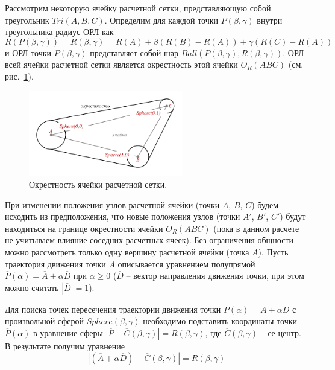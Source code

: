 Рассмотрим некоторую ячейку расчетной сетки, представляющую собой треугольник $Tri(A, B, C)$.
Определим для каждой точки $P(\beta,\gamma)$ внутри треугольника радиус ОРЛ как
\begin{equation}
	R(P(\beta,\gamma)) = R(\beta,\gamma) = R(A) + \beta(R(B) - R(A)) + \gamma(R(C) - R(A))
\end{equation}
и ОРЛ точки $P(\beta,\gamma)$ представляет собой шар $Ball(P(\beta,\gamma), R(\beta,\gamma))$.
ОРЛ всей ячейки расчетной сетки является окрестность этой ячейки $O_R(ABC)$ (см. рис.~\ref{fig:text_1_remesh_common_envelope_1}).

\begin{figure}[ht]
\centering
\includegraphics[width=0.6\textwidth]{fig/3dr_triangle.pdf}
\singlespacing
{}\caption{Окрестность ячейки расчетной сетки.}
\label{fig:text_1_remesh_common_envelope_1}
\end{figure}

При изменении положения узлов расчетной ячейки (точки $A$, $B$, $C$) будем исходить из предположения, что новые положения узлов (точки $A'$, $B'$, $C'$) будут находиться на границе окрестности ячейки $O_R(ABC)$ (пока в данном расчете не учитываем влияние соседних расчетных ячеек).
Без ограничения общности можно рассмотреть только одну вершину расчетной ячейки (точка $A$).
Пусть траектория движения точки $A$ описывается уравнением полупрямой $\overline{P}(\alpha) = \overline{A} + \alpha \overline{D}$ при $\alpha \ge 0$ ($\overline{D}$ -- вектор направления движения точки, при этом можно считать $|\overline{D}| = 1$).

Для поиска точек пересечения траектории движения точки $\overline{P}(\alpha) = \overline{A} + \alpha \overline{D}$ с 
произвольной сферой $Sphere(\beta,\gamma)$ необходимо подставить координаты точки $\overline{P}(\alpha)$ в уравнение сферы $|\overline{P} - \overline{C}(\beta,\gamma)| = R(\beta,\gamma)$, где $\overline{C}(\beta,\gamma)$ -- ее центр.
В результате получим уравнение
\begin{equation}\label{eqn:text_1_remesh_common_envelope_eq}
	|(\overline{A} + \alpha \overline{D}) - \overline{C}(\beta, \gamma)| = R(\beta, \gamma)
\end{equation}

